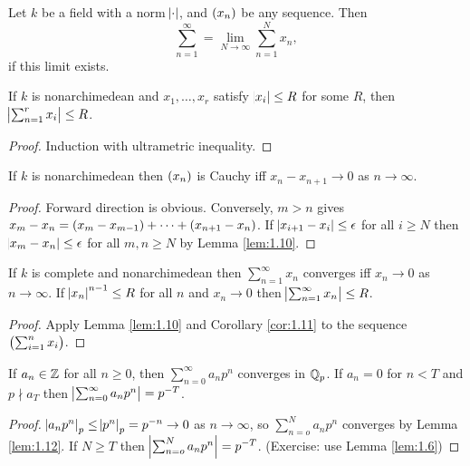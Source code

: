 \pagebreak

\begin{definition}
Let $ k $ be a field with a norm $ \abs{\cdot} $, and $ \br{x_n} $ be any sequence. Then
$$ \sum_{n = 1}^\infty = \lim_{N \to \infty} \sum_{n = 1}^N x_n, $$
if this limit exists.
\end{definition}

\begin{lemma}
\label{lem:1.10}
If $ k $ is nonarchimedean and $ x_1, \dots, x_r $ satisfy $ \abs{x_i} \le R $ for some $ R $, then $ \abs{\sum_{n = 1}^r x_i} \le R $.
\end{lemma}

\begin{proof}
Induction with ultrametric inequality.
\end{proof}

\begin{corollary}
\label{cor:1.11}
If $ k $ is nonarchimedean then $ \br{x_n} $ is Cauchy iff $ x_n - x_{n + 1} \to 0 $ as $ n \to \infty $.
\end{corollary}

\begin{proof}
Forward direction is obvious. Conversely, $ m > n $ gives $ x_m - x_n = \br{x_m - x_{m - 1}} + \dots + \br{x_{n + 1} - x_n} $. If $ \abs{x_{i + 1} - x_i} \le \epsilon $ for all $ i \ge N $ then $ \abs{x_m - x_n} \le \epsilon $ for all $ m, n \ge N $ by Lemma \ref{lem:1.10}.
\end{proof}

\begin{lemma}
\label{lem:1.12}
If $ k $ is complete and nonarchimedean then $ \sum_{n = 1}^\infty x_n $ converges iff $ x_n \to 0 $ as $ n \to \infty $. If $ \abs{x_n}^{n - 1} \le R $ for all $ n $ and $ x_n \to 0 $ then $ \abs{\sum_{n = 1}^\infty x_n} \le R $.
\end{lemma}

\begin{proof}
Apply Lemma \ref{lem:1.10} and Corollary \ref{cor:1.11} to the sequence $ \br{\sum_{i = 1}^n x_i} $.
\end{proof}

\begin{lemma}
\label{lem:1.13}
If $ a_n \in \mathbb{Z} $ for all $ n \ge 0 $, then $ \sum_{n = 0}^\infty a_np^n $ converges in $ \mathbb{Q}_p $. If $ a_n = 0 $ for $ n < T $ and $ p \nmid a_T $ then $ \abs{\sum_{n = 0}^\infty a_np^n} = p^{-T} $.
\end{lemma}

\begin{proof}
$ \abs{a_np^n}_p \le \abs{p^n}_p = p^{-n} \to 0 $ as $ n \to \infty $, so $ \sum_{n = o}^N a_np^n $ converges by Lemma \ref{lem:1.12}. If $ N \ge T $ then $ \abs{\sum_{n = o}^N a_np^n} = p^{-T} $. (Exercise: use Lemma \ref{lem:1.6})
\end{proof}

